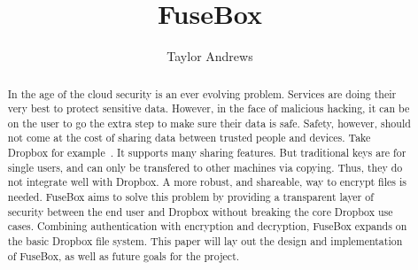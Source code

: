 \documentclass[11pt,twocolumn,letterpaper]{article}
\newcommand{\appname}{FuseBox }
\newcommand{\appnameWOspace}{FuseBox}
\begin{document}
\title{\appname}

\author{Taylor Andrews}

\maketitle

\begin{abstract}
In the age of the cloud security is an ever evolving problem. 
Services are doing their very best to protect sensitive data. 
However, in the face of malicious hacking, it can be on the user to go the extra step to make sure
their data is safe. Safety, however, should not come at the cost of
sharing data between trusted people and devices. Take Dropbox for
example~\cite{dropbox}. 
It supports many sharing features. But traditional keys are for single
users, and can only be transfered to other machines via
copying. Thus, they do not integrate well with Dropbox. 
A more robust,
and shareable, way to encrypt files is needed. 
\appname aims to solve this problem by providing a
transparent layer of security between the end user and Dropbox
without breaking the core Dropbox use cases.
Combining authentication with encryption and decryption, \appname
expands on the basic Dropbox file system.  
This paper will lay out
the design and implementation of \appnameWOspace, as well as 
future goals for the project.    
\end{abstract}
\end{document}
